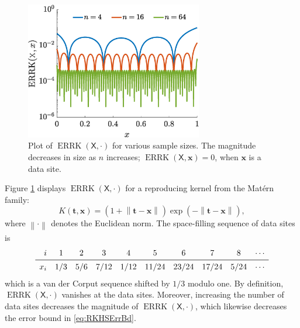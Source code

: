 \documentclass[]{mcom-l}
\theoremstyle{remark}
\DeclareMathOperator{\errK}{ERRK}
\newcommand{\mX}{\mathsf{X}}
\newcommand{\bx}{{\boldsymbol{x}}}
\newcommand{\bt}{{\boldsymbol{t}}}
\newcommand{\norm}[2][{}]{\ensuremath{\left \lVert #2 \right \rVert}_{#1}}
\begin{document}
\begin{figure}[H]
	\centering
	\includegraphics[height =6cm]{ProgramsImages/errKplot.eps}
	\caption{Plot of $\errK(\mX,\cdot)$ for various sample sizes.  The magnitude decreases in size as $n$ increases; $\errK(\mX,\bx) = 0$, when $\bx$ is a data site. \label{fig:errK}}
\end{figure}

Figure \ref{fig:errK} displays   $\errK(\mX,\cdot)$  for a reproducing kernel from the Mat\'ern family: 
	\begin{equation} \label{eq:MaternOne}
K(\bt,\bx) = (1 +  \norm{\bt-\bx}) \exp(-\norm{\bt-\bx}),
\end{equation}
where $\norm{\cdot}$ denotes the Euclidean norm.  The space-filling sequence of data sites is 
\begin{equation} \label{eq:FixedVDCDes}
\begin{array}{rccccccccc}
i  & 1 & 2 & 3 & 4 & 5 & 6 & 7 & 8 & \cdots\\
\midrule
x_i & 1/3 & 5/6 & 7/12 & 1/12 & 11/24 & 23/24 & 17/24 & 5 /24 & \cdots
\end{array}
\end{equation}
which is a van der Corput sequence \cite{} shifted by $1/3$ modulo one.  By definition, $\errK(\mX,\cdot)$ vanishes at the data sites.  Moreover, increasing the number of data sites decreases the magnitude of $\errK(\mX,\cdot)$, which likewise decreases the error bound in \eqref{eq:RKHSErrBd}.
\end{document}
